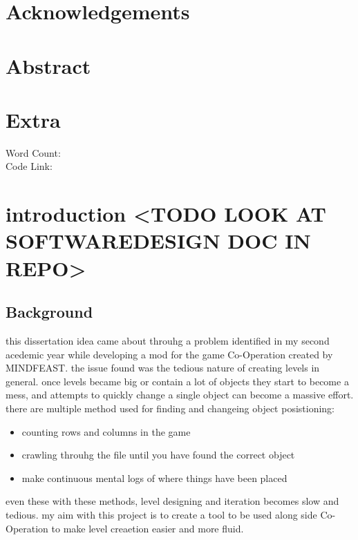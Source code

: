 
\section*{Acknowledgements}

\section*{Abstract}

\section*{Extra}
Word Count:\\
Code Link:


\clearpage
{}
\tableofcontents
\clearpage
{}
\listoffigures
\clearpage


\section{introduction <TODO LOOK AT SOFTWAREDESIGN DOC IN REPO>}
\subsection{Background}
this dissertation idea came about throuhg a problem identified in my second acedemic year while developing a mod for the game Co-Operation created by MINDFEAST. the issue found was the tedious nature of creating levels in general. once levels became big or contain a lot of objects they start to become a mess, and attempts to quickly change a single object can become a massive effort. there are multiple method used for finding and changeing object posistioning:
\begin{itemize}
    \item counting rows and columns in the game 
    \item crawling throuhg the file until you have found the correct object
    \item make continuous mental logs of where things have been placed 
\end{itemize}
even these with these methods, level designing and iteration becomes slow and tedious. my aim with this project is to create a tool to be used along side Co-Operation to make level creaetion easier and more fluid. 
